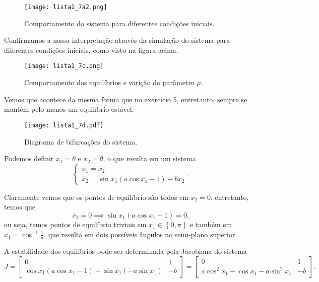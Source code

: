 \documentclass[a4paper]{report}
\begin{document}
\begin{figure}[H]
    \centering
    \texttt{[image: lista1\_7a2.png]}
    \caption{Comportamento do sistema para diferentes condições iniciais.}
    \label{fig:lista1_7a2-png}
\end{figure}

Confirmamos a nossa interpretação através da simulação do sistema para diferentes condições iniciais, como visto na figura acima.


\begin{figure}[H]
    \centering
    \texttt{[image: lista1\_7c.png]}
    \caption{Comportamento dos equilíbrios e varição do parâmetro $\mu$.}
    \label{fig:lista1_7c-png}
\end{figure}

Vemos que acontece da mesma forma que no exercício 5, entretanto, sempre se mantém pelo menos um equilíbrio estável.


\begin{figure}[H]
    \centering
    \texttt{[image: lista1\_7d.pdf]}
    \caption{Diagrama de bifurcações do sistema.}
    \label{fig:lista1_7d-png}
\end{figure}


Podemos definir $x_1 = \theta$ e $x_2 = \dot{\theta}$, o que resulta em um sistema \[
\begin{cases}
    \dot{x_1} = x_2 \\
    \dot{x_2} = \sin x_1\left( a\cos x_1 -1 \right) -bx_2
\end{cases}
.\] 

Claramente vemos que os pontos de equilíbrio são todos em $x_2=0$, entretanto, temos que \[
\dot{x_2} = 0 \implies \sin x_1 \left( a\cos x_1 - 1 \right) = 0
,\] ou seja, temos pontos de equilíbrio triviais em $x_1 \in  \left\{ 0, \pi \right\} $ e também em $x_1 = \cos^{-1} \frac{1}{a}$, que resulta em dois possíveis ângulos no semi-plano superior.

A estabilidade dos equilíbrios pode ser determinada pela Jacobiana do sistema \[
J = \begin{bmatrix} 
    0 & 1 \\
    \cos x_1\left( a\cos x_1 -1 \right) + \sin x_1 \left( -a \sin x_1 \right) & -b
\end{bmatrix} = \begin{bmatrix} 
    0 & 1 \\
    a\cos^2 x_1 -\cos x_1 -a \sin^2 x_1 & -b
\end{bmatrix} 
.\]
\end{document}
